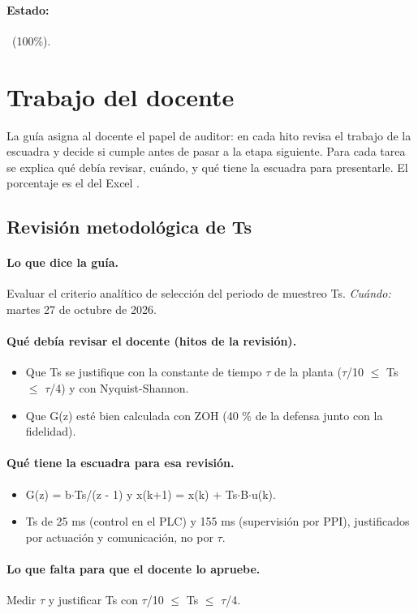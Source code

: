 \documentclass[a4paper,11pt]{article}
\begin{document}
\paragraph{Estado:} \cumple~(100\%).
\section{Trabajo del docente}
La guía asigna al docente el papel de auditor: en cada hito revisa el trabajo de la escuadra y decide si cumple antes de pasar a la etapa siguiente. Para cada tarea se explica qué debía revisar, cuándo, y qué tiene la escuadra para presentarle. El porcentaje es el del Excel .
\subsection{Revisión metodológica de Ts}
\paragraph{Lo que dice la guía.} Evaluar el criterio analítico de selección del periodo de muestreo Ts. \textit{Cuándo:} martes 27 de octubre de 2026.
\paragraph{Qué debía revisar el docente (hitos de la revisión).}
\begin{itemize}
\item[$\square$] Que Ts se justifique con la constante de tiempo $\tau$ de la planta ($\tau$/10 $\le$ Ts $\le$ $\tau$/4) y con Nyquist-Shannon.
\item[$\square$] Que G(z) esté bien calculada con ZOH (40 \% de la defensa junto con la fidelidad).
\end{itemize}
\paragraph{Qué tiene la escuadra para esa revisión.}
\begin{itemize}
\item G(z) = b$\cdot$Ts/(z - 1) y x(k+1) = x(k) + Ts$\cdot$B$\cdot$u(k).
\item Ts de 25 ms (control en el PLC) y 155 ms (supervisión por PPI), justificados por actuación y comunicación, no por $\tau$.
\end{itemize}
\paragraph{Lo que falta para que el docente lo apruebe.} Medir $\tau$ y justificar Ts con $\tau$/10 $\le$ Ts $\le$ $\tau$/4.
\end{document}
